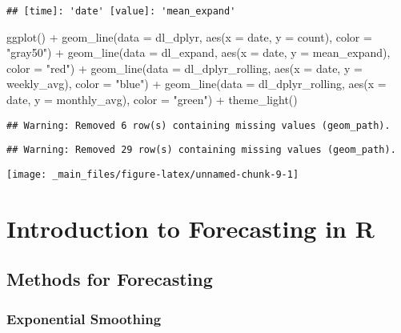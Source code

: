 \documentclass[
]{book}
\newenvironment{Shaded}{\begin{snugshade}}{\end{snugshade}}
\newcommand{\AttributeTok}[1]{\textcolor[rgb]{0.77,0.63,0.00}{#1}}
\newcommand{\FunctionTok}[1]{\textcolor[rgb]{0.00,0.00,0.00}{#1}}
\newcommand{\NormalTok}[1]{#1}
\newcommand{\SpecialCharTok}[1]{\textcolor[rgb]{0.00,0.00,0.00}{#1}}
\newcommand{\StringTok}[1]{\textcolor[rgb]{0.31,0.60,0.02}{#1}}
\begin{document}
\begin{verbatim}
## [time]: 'date' [value]: 'mean_expand'
\end{verbatim}

\begin{Shaded}
\begin{Highlighting}[]
\FunctionTok{ggplot}\NormalTok{() }\SpecialCharTok{+}
  \FunctionTok{geom\_line}\NormalTok{(}\AttributeTok{data =}\NormalTok{ dl\_dplyr, }\FunctionTok{aes}\NormalTok{(}\AttributeTok{x =}\NormalTok{ date, }\AttributeTok{y =}\NormalTok{ count), }\AttributeTok{color =} \StringTok{"gray50"}\NormalTok{) }\SpecialCharTok{+}
  \FunctionTok{geom\_line}\NormalTok{(}\AttributeTok{data =}\NormalTok{ dl\_expand, }\FunctionTok{aes}\NormalTok{(}\AttributeTok{x =}\NormalTok{ date, }\AttributeTok{y =}\NormalTok{ mean\_expand), }\AttributeTok{color =} \StringTok{"red"}\NormalTok{) }\SpecialCharTok{+} 
  \FunctionTok{geom\_line}\NormalTok{(}\AttributeTok{data =}\NormalTok{ dl\_dplyr\_rolling, }\FunctionTok{aes}\NormalTok{(}\AttributeTok{x =}\NormalTok{ date, }\AttributeTok{y =}\NormalTok{ weekly\_avg), }\AttributeTok{color =} \StringTok{"blue"}\NormalTok{) }\SpecialCharTok{+} 
  \FunctionTok{geom\_line}\NormalTok{(}\AttributeTok{data =}\NormalTok{ dl\_dplyr\_rolling, }\FunctionTok{aes}\NormalTok{(}\AttributeTok{x =}\NormalTok{ date, }\AttributeTok{y =}\NormalTok{ monthly\_avg), }\AttributeTok{color =} \StringTok{"green"}\NormalTok{) }\SpecialCharTok{+} 
  \FunctionTok{theme\_light}\NormalTok{()}
\end{Highlighting}
\end{Shaded}

\begin{verbatim}
## Warning: Removed 6 row(s) containing missing values (geom_path).
\end{verbatim}

\begin{verbatim}
## Warning: Removed 29 row(s) containing missing values (geom_path).
\end{verbatim}

\begin{center}\texttt{[image: \_main\_files/figure-latex/unnamed-chunk-9-1]} \end{center}

\hypertarget{introduction-to-forecasting-in-r}{%
\chapter{Introduction to Forecasting in R}\label{introduction-to-forecasting-in-r}}

\hypertarget{methods-for-forecasting}{%
\section{Methods for Forecasting}\label{methods-for-forecasting}}

\hypertarget{exponential-smoothing}{%
\subsection{Exponential Smoothing}\label{exponential-smoothing}}

  
\end{document}
